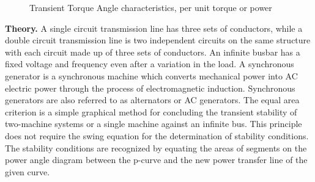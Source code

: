 \documentclass[main.tex]{subfiles}
\begin{document}
\begin{enumerate}
\begin{figure}
\centering{}
\caption{Transient Torque Angle characteristics, per unit torque or power}
\label{fig:24q_a}
\end{figure}

\textbf{Theory.} A single circuit transmission line has three sets of conductors, while a double circuit transmission line is two independent circuits on the same structure with each circuit made up of three sets of conductors. An infinite busbar has a fixed voltage and frequency even after a variation in the load. A synchronous generator is a synchronous machine which converts mechanical power into AC electric power through the process of electromagnetic induction. Synchronous generators are also referred to as alternators or AC generators. The equal area criterion is a simple graphical method for concluding the transient stability of two-machine systems or a single machine against an infinite bus. This principle does not require the swing equation for the determination of stability conditions. The stability conditions are recognized by equating the areas of segments on the power angle diagram between the p-curve and the new power transfer line of the given curve.


\end{enumerate}
\end{document}
